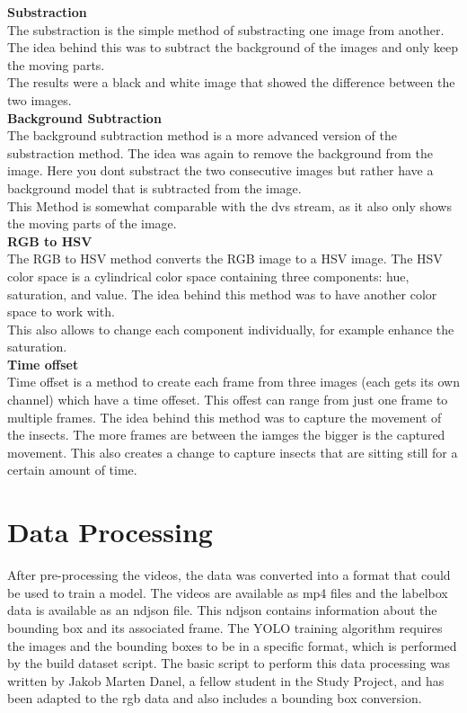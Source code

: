 \textbf{Substraction} \\
The substraction is the simple method of substracting one image from another. The idea behind this was to subtract the background of the images and only keep the moving parts.\\
The results were a black and white image that showed the difference between the two images.\\

\textbf{Background Subtraction} \\
The background subtraction method is a more advanced version of the substraction method. The idea was again to remove the background from the image. Here you dont substract the two consecutive images but rather have a background model that is subtracted from the image.\\
This Method is somewhat comparable with the dvs stream, as it also only shows the moving parts of the image.\\

\textbf{RGB to HSV} \\
The RGB to HSV method converts the RGB image to a HSV image. The HSV color space is a cylindrical color space containing three components: hue, saturation, and value. The idea behind this method was to have another color space to work with.\\
This also allows to change each component individually, for example enhance the saturation.\\

\textbf{Time offset} \\
Time offset is a method to create each frame from three images (each gets its own channel) which have a time offeset. This offest can range from just one frame to multiple frames. The idea behind this method was to capture the movement of the insects. The more frames are between the iamges the bigger is the captured movement. This also creates a change to capture insects that are sitting still for a certain amount of time.\\

\section{Data Processing}

After pre-processing the videos, the data was converted into a format that could be used to train a model. The videos are available as mp4 files and the labelbox data is available as an ndjson file. This ndjson contains information about the bounding box and its associated frame. The YOLO training algorithm requires the images and the bounding boxes to be in a specific format, which is performed by the build dataset script. The basic script to perform this data processing was written by Jakob Marten Danel, a fellow student in the Study Project, and has been adapted to the rgb data and also includes a bounding box conversion. \\

